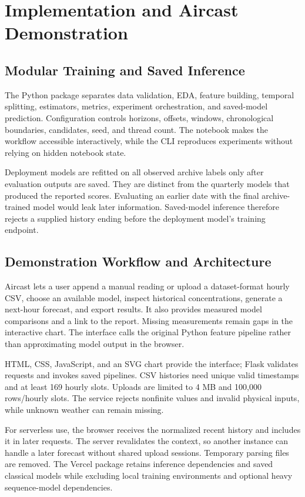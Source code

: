 \documentclass[conference]{IEEEtran}
\begin{document}
\section{Implementation and Aircast Demonstration}
\subsection{Modular Training and Saved Inference}
The Python package separates data validation, EDA, feature building, temporal splitting, estimators, metrics, experiment orchestration, and saved-model prediction. Configuration controls horizons, offsets, windows, chronological boundaries, candidates, seed, and thread count. The notebook makes the workflow accessible interactively, while the CLI reproduces experiments without relying on hidden notebook state.

Deployment models are refitted on all observed archive labels only after evaluation outputs are saved. They are distinct from the quarterly models that produced the reported scores. Evaluating an earlier date with the final archive-trained model would leak later information. Saved-model inference therefore rejects a supplied history ending before the deployment model's training endpoint.

\subsection{Demonstration Workflow and Architecture}
Aircast lets a user append a manual reading or upload a dataset-format hourly CSV, choose an available model, inspect historical concentrations, generate a next-hour forecast, and export results. It also provides measured model comparisons and a link to the report. Missing measurements remain gaps in the interactive chart. The interface calls the original Python feature pipeline rather than approximating model output in the browser.

HTML, CSS, JavaScript, and an SVG chart provide the interface; Flask validates requests and invokes saved pipelines. CSV histories need unique valid timestamps and at least 169 hourly slots. Uploads are limited to 4 MB and 100,000 rows/hourly slots. The service rejects nonfinite values and invalid physical inputs, while unknown weather can remain missing.

For serverless use, the browser receives the normalized recent history and includes it in later requests. The server revalidates the context, so another instance can handle a later forecast without shared upload sessions. Temporary parsing files are removed. The Vercel package retains inference dependencies and saved classical models while excluding local training environments and optional heavy sequence-model dependencies.
\end{document}
